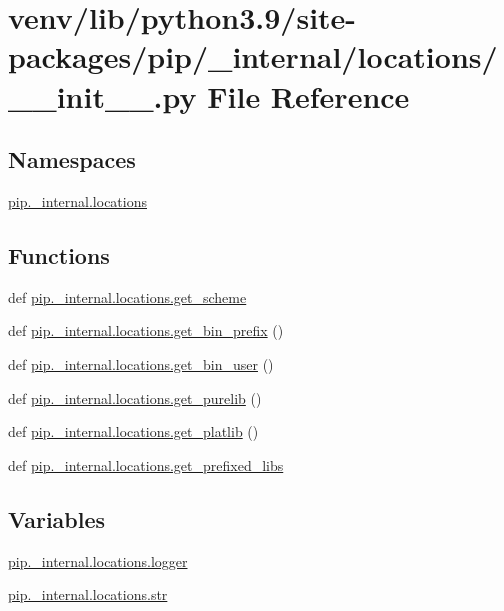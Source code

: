 \hypertarget{venv_2lib_2python3_89_2site-packages_2pip_2__internal_2locations_2____init_____8py}{}\section{venv/lib/python3.9/site-\/packages/pip/\+\_\+internal/locations/\+\_\+\+\_\+init\+\_\+\+\_\+.py File Reference}
\label{venv_2lib_2python3_89_2site-packages_2pip_2__internal_2locations_2____init_____8py}
\subsection*{Namespaces}
\begin{DoxyCompactItemize}
\item 
 \hyperlink{namespacepip_1_1__internal_1_1locations}{pip.\+\_\+internal.\+locations}
\end{DoxyCompactItemize}
\subsection*{Functions}
\begin{DoxyCompactItemize}
\item 
def \hyperlink{namespacepip_1_1__internal_1_1locations_ab4dfbceafc4eee95b0b921654574da53}{pip.\+\_\+internal.\+locations.\+get\+\_\+scheme}
\item 
def \hyperlink{namespacepip_1_1__internal_1_1locations_a92ffd6d78b56bff8d5c053858f849ac9}{pip.\+\_\+internal.\+locations.\+get\+\_\+bin\+\_\+prefix} ()
\item 
def \hyperlink{namespacepip_1_1__internal_1_1locations_a676a00881609d30628476f97b671d31d}{pip.\+\_\+internal.\+locations.\+get\+\_\+bin\+\_\+user} ()
\item 
def \hyperlink{namespacepip_1_1__internal_1_1locations_a02178a88bffc5811ebb85155ef65fffd}{pip.\+\_\+internal.\+locations.\+get\+\_\+purelib} ()
\item 
def \hyperlink{namespacepip_1_1__internal_1_1locations_a7fb6fe730b484324e8c68c1beb8fa735}{pip.\+\_\+internal.\+locations.\+get\+\_\+platlib} ()
\item 
def \hyperlink{namespacepip_1_1__internal_1_1locations_aa6b1a7d0519b9412304cb1f00722aa14}{pip.\+\_\+internal.\+locations.\+get\+\_\+prefixed\+\_\+libs}
\end{DoxyCompactItemize}
\subsection*{Variables}
\begin{DoxyCompactItemize}
\item 
\hyperlink{namespacepip_1_1__internal_1_1locations_a4eaf836f2839a717fc720247323b1251}{pip.\+\_\+internal.\+locations.\+logger}
\item 
\hyperlink{namespacepip_1_1__internal_1_1locations_aeb081a5421d9074db2a25fa0debe62fc}{pip.\+\_\+internal.\+locations.\+str}
\end{DoxyCompactItemize}
